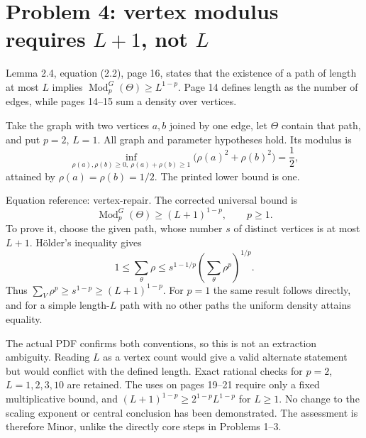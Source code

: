 \documentclass[10pt]{article}
\begin{document}
\section*{Problem 4: vertex modulus requires \(L+1\), not \(L\)}
Lemma 2.4, equation (2.2), page 16, states that the existence of a path of length at most \(L\) implies \(\operatorname{Mod}_p^G(\Theta)\ge L^{1-p}\). Page 14 defines length as the number of edges, while pages 14–15 sum a density over vertices.\par
Take the graph with two vertices \(a,b\) joined by one edge, let \(\Theta\) contain that path, and put \(p=2\), \(L=1\). All graph and parameter hypotheses hold. Its modulus is \[\inf_{\rho(a),\rho(b)\ge0,\ \rho(a)+\rho(b)\ge1}
      \bigl(\rho(a)^2+\rho(b)^2\bigr)=\frac12,\] attained by \(\rho(a)=\rho(b)=1/2\). The printed lower bound is one.\par
Equation reference: vertex-repair. The corrected universal bound is \[
 \operatorname{Mod}_p^G(\Theta)\ge(L+1)^{1-p},\qquad p\ge1.\] To prove it, choose the given path, whose number \(s\) of distinct vertices is at most \(L+1\). Hölder’s inequality gives \[1\le\sum_{\theta}\rho
 \le s^{1-1/p}\left(\sum_{\theta}\rho^p\right)^{1/p}.\] Thus \(\sum_V\rho^p\ge s^{1-p}\ge(L+1)^{1-p}\). For \(p=1\) the same result follows directly, and for a simple length-\(L\) path with no other paths the uniform density attains equality.\par
The actual PDF confirms both conventions, so this is not an extraction ambiguity. Reading \(L\) as a vertex count would give a valid alternate statement but would conflict with the defined length. Exact rational checks for \(p=2\), \(L=1,2,3,10\) are retained. The uses on pages 19–21 require only a fixed multiplicative bound, and \((L+1)^{1-p}\ge2^{1-p}L^{1-p}\) for \(L\ge1\). No change to the scaling exponent or central conclusion has been demonstrated. The assessment is therefore Minor, unlike the directly core steps in Problems 1–3.\par
\end{document}
